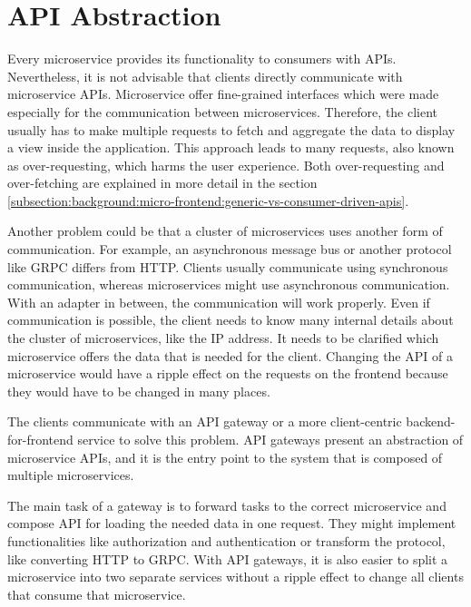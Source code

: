 \section{API Abstraction}\label{section:background:api-abstraction}

Every microservice provides its functionality to consumers with APIs. Nevertheless, it is not advisable that clients directly communicate with microservice APIs. Microservice offer fine-grained interfaces which were made especially for the communication between microservices. Therefore, the client usually has to make multiple requests to fetch and aggregate the data to display a view inside the application. \cite[69]{book:2021:newman:background:bff:micro-services} This approach leads to many requests, also known as over-requesting, which harms the user experience. \cite[254, 257]{book:2018:richardson:background:bff:microservices-patterns} Both over-requesting and over-fetching are explained in more detail in the section \ref{subsection:background:micro-frontend:generic-vs-consumer-driven-apis}.

\bigskip

\noindent Another problem could be that a cluster of microservices uses another form of communication. For example, an asynchronous message bus or another protocol like GRPC differs from HTTP. Clients usually communicate using synchronous communication, whereas microservices might use asynchronous communication. With an adapter in between, the communication will work properly. Even if communication is possible, the client needs to know many internal details about the cluster of microservices, like the IP address. It needs to be clarified which microservice offers the data that is needed for the client. Changing the API of a microservice would have a ripple effect on the requests on the frontend because they would have to be changed in many places. \cite[254-257]{book:2018:richardson:background:bff:microservices-patterns}

\bigskip

\noindent The clients communicate with an API gateway or a more client-centric backend-for-frontend service to solve this problem. API gateways present an abstraction of microservice APIs, and it is the entry point to the system that is composed of multiple microservices. \cite[19-20]{book:2020:siriwardena:background:bff:microservice-security-in-action}

\bigskip

\noindent The main task of a gateway is to forward tasks to the correct microservice and compose API for loading the needed data in one request. They might implement functionalities like authorization and authentication or transform the protocol, like converting HTTP to GRPC. With API gateways, it is also easier to split a microservice into two separate services without a ripple effect to change all clients that consume that microservice. \cite[260-263]{book:2018:richardson:background:bff:microservices-patterns}

